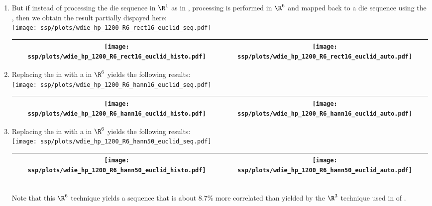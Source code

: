 \begin{example}
\begin{enumerate}
  \item \label{item:wdie_hp_R6_rect16_euclid}
        But if instead of processing the die sequence in $\R^1$ as in ,
        processing is performed in $\R^6$ 
        and mapped back to a die sequence using the ,
        then we obtain the result partially dispayed here:
        \\\texttt{[image: ssp/plots/wdie\_hp\_1200\_R6\_rect16\_euclid\_seq.pdf]}
        \\\begin{tabular}{|>{\scs}c|>{\scs}c|}
             \hline
             \texttt{[image: ssp/plots/wdie\_hp\_1200\_R6\_rect16\_euclid\_histo.pdf]}
            &\texttt{[image: ssp/plots/wdie\_hp\_1200\_R6\_rect16\_euclid\_auto.pdf]}
           \\\hline
        \end{tabular}

  \item \label{item:wdie_hp_R6_hann16_euclid}
        Replacing the  in 
        with a  in $\R^6$ yields the following results:
        \\\texttt{[image: ssp/plots/wdie\_hp\_1200\_R6\_hann16\_euclid\_seq.pdf]}
        \\\begin{tabular}{|>{\scs}c|>{\scs}c|}
             \hline
             \texttt{[image: ssp/plots/wdie\_hp\_1200\_R6\_hann16\_euclid\_histo.pdf]}
            &\texttt{[image: ssp/plots/wdie\_hp\_1200\_R6\_hann16\_euclid\_auto.pdf]}
           \\\hline
        \end{tabular}

  \item \label{item:wdie_hp_R6_hann50_euclid}
        Replacing the  in 
        with a  in $\R^6$ yields the following results:
        \\\texttt{[image: ssp/plots/wdie\_hp\_1200\_R6\_hann50\_euclid\_seq.pdf]}
        \\\begin{tabular}{|>{\scs}c|>{\scs}c|}
             \hline
             \texttt{[image: ssp/plots/wdie\_hp\_1200\_R6\_hann50\_euclid\_histo.pdf]}
            &\texttt{[image: ssp/plots/wdie\_hp\_1200\_R6\_hann50\_euclid\_auto.pdf]}
           \\\hline
        \end{tabular}\\
     Note that this $\R^6$ technique yields a sequence that is about 8.7\% more correlated than yielded by the $\R^3$ technique
     used in  of .


\end{enumerate}
\end{example}
